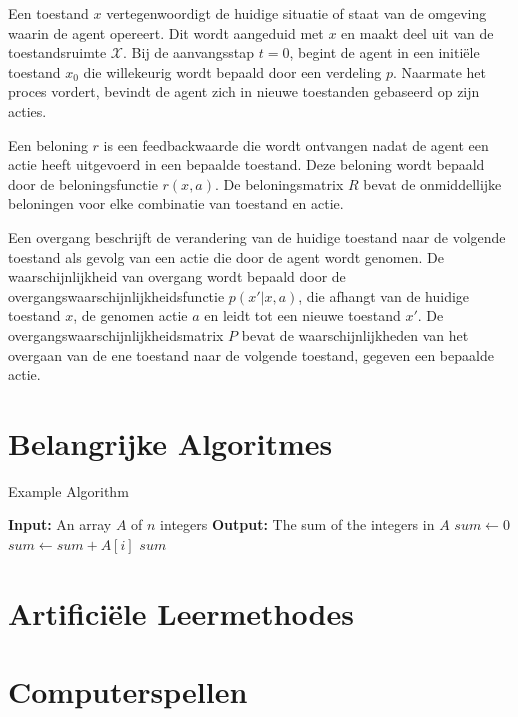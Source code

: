 \documentclass[a4paper,12pt]{report}
\begin{document}
Een toestand \( x \) vertegenwoordigt de huidige situatie of staat van de
omgeving waarin de agent opereert. Dit wordt aangeduid met \( x \) en maakt
deel uit van de toestandsruimte \( \mathcal{X} \). Bij de aanvangsstap \( t = 0
\), begint de agent in een initiële toestand \( x_0 \) die willekeurig wordt
bepaald door een verdeling \( p \). Naarmate het proces vordert, bevindt de
agent zich in nieuwe toestanden gebaseerd op zijn acties.

Een beloning \( r \) is een feedbackwaarde die wordt ontvangen nadat de agent
een actie heeft uitgevoerd in een bepaalde toestand. Deze beloning wordt
bepaald door de beloningsfunctie \( r(x, a) \). De beloningsmatrix \( R \)
bevat de onmiddellijke beloningen voor elke combinatie van toestand en actie.

Een overgang beschrijft de verandering van de huidige toestand naar de volgende
toestand als gevolg van een actie die door de agent wordt genomen. De
waarschijnlijkheid van overgang wordt bepaald door de
overgangswaarschijnlijkheidsfunctie \( p(x'|x, a) \), die afhangt van de
huidige toestand \( x \), de genomen actie \( a \) en leidt tot een nieuwe
toestand \( x' \). De overgangswaarschijnlijkheidsmatrix \( P \) bevat de
waarschijnlijkheden van het overgaan van de ene toestand naar de volgende
toestand, gegeven een bepaalde actie.

\section{Belangrijke Algoritmes}

\begin{algorithm}
  \caption{Example Algorithm}
  \begin{algorithmic}[1] %
      \State \textbf{Input:} An array $A$ of $n$ integers
      \State \textbf{Output:} The sum of the integers in $A$
      \State $sum \gets 0$
          \State $sum \gets sum + A[i]$
      \EndFor
      \State \Return $sum$
  \end{algorithmic}
  \end{algorithm}

\section{Artificiële Leermethodes}

\section{Computerspellen}
\end{document}
